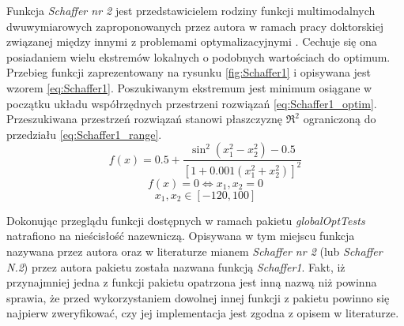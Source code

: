\par
Funkcja \emph{Schaffer nr 2} jest przedstawicielem rodziny funkcji multimodalnych dwuwymiarowych zaproponowanych przez autora w ramach pracy doktorskiej związanej między innymi z problemami optymalizacyjnymi \cite{schaffer1985some}. Cechuje się ona posiadaniem wielu ekstremów lokalnych o podobnych wartościach do optimum. Przebieg funkcji zaprezentowany na rysunku \ref{fig:Schaffer1} i opisywana jest wzorem \ref{eq:Schaffer1}. Poszukiwanym ekstremum jest minimum osiągane w początku układu współrzędnych przestrzeni rozwiązań \ref{eq:Schaffer1_optim}. Przeszukiwana przestrzeń rozwiązań stanowi płaszczyznę $\Re^2$ ograniczoną do przedziału \ref{eq:Schaffer1_range}.
\begin{equation} \label{eq:Schaffer1}
f(x)=0.5+\frac{\sin^2(x_1^2-x_2^2)-0.5}{[1+0.001(x_1^2+x_2^2)]^2}
\end{equation}
\begin{equation} \label{eq:Schaffer1_optim}
f(x)=0 \Leftrightarrow x_1,x_2=0
\end{equation}
\begin{equation} \label{eq:Schaffer1_range}
x_1,x_2\in[-120,100]
\end{equation}
\par
Dokonując przeglądu funkcji dostępnych w ramach pakietu \emph{globalOptTests} natrafiono na nieścisłość nazewniczą. Opisywana w tym miejscu funkcja nazywana przez autora oraz w literaturze mianem \emph{Schaffer nr 2} (lub \emph{Schaffer N.2}) przez autora pakietu została nazwana funkcją \emph{Schaffer1}. Fakt, iż przynajmniej jedna z funkcji pakietu opatrzona jest inną nazwą niż powinna sprawia, że przed wykorzystaniem dowolnej innej funkcji z pakietu powinno się najpierw zweryfikować, czy jej implementacja jest zgodna z opisem w literaturze.


